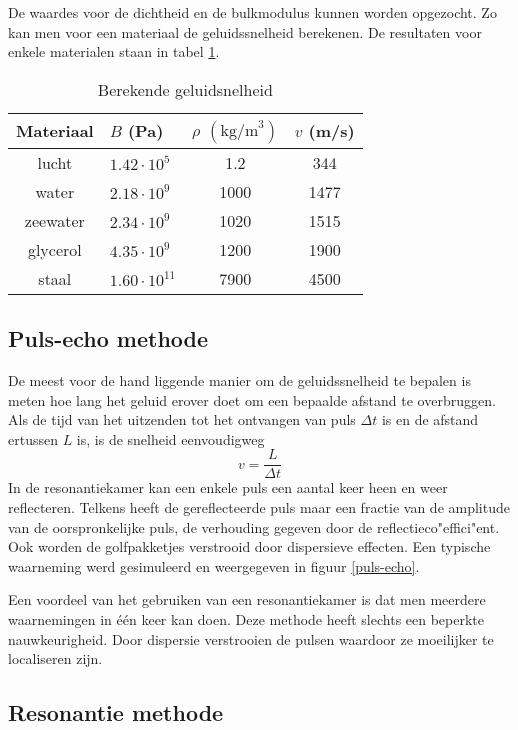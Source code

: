 De waardes voor de dichtheid en de bulkmodulus kunnen worden opgezocht. Zo kan 
men voor een materiaal de geluidssnelheid berekenen. De resultaten voor enkele 
materialen staan in tabel \ref{speedtable}. 

\begin{table}[htb]
\caption{Berekende geluidsnelheid}
\label{speedtable}
\begin{center}
\begin{tabular}{c||lcc}
Materiaal & $B$ (Pa) & $\rho$ $(\textrm{kg/m}^3)$ & $v$ (m/s) \\\hline
lucht	& $1.42 \cdot 10^5$	& 1.2  & 344  \\
water	& $2.18 \cdot 10^9$	& 1000 & 1477 \\
zeewater& $2.34 \cdot 10^9$	& 1020 & 1515 \\
glycerol& $4.35 \cdot 10^9$	& 1200 & 1900 \\
staal	& $1.60 \cdot 10^{11}$	& 7900 & 4500 \\
\end{tabular}
\end{center}
\end{table}

\subsection{Puls-echo methode}
De meest voor de hand liggende manier om de geluidssnelheid te bepalen is meten 
hoe lang het geluid erover doet om een bepaalde afstand te overbruggen. Als de 
tijd van het uitzenden tot het ontvangen van puls $\Delta t$ is en de afstand 
ertussen $L$ is, is de snelheid eenvoudigweg
$$
v = \frac{L}{\Delta t}
$$
In de resonantiekamer kan een enkele puls een aantal keer heen en weer 
reflecteren. Telkens heeft de gereflecteerde puls maar een fractie van de 
amplitude van de oorspronkelijke puls, de verhouding gegeven door de 
reflectieco"effici"ent.  Ook worden de golfpakketjes verstrooid door 
dispersieve effecten. Een typische waarneming werd gesimuleerd en weergegeven 
in figuur \ref{puls-echo}. 


Een voordeel van het gebruiken van een resonantiekamer is dat
men meerdere waarnemingen in \'e\'en keer kan doen.
Deze methode heeft slechts een beperkte nauwkeurigheid. Door dispersie 
verstrooien de pulsen waardoor ze moeilijker te localiseren zijn.

\subsection{Resonantie methode}

